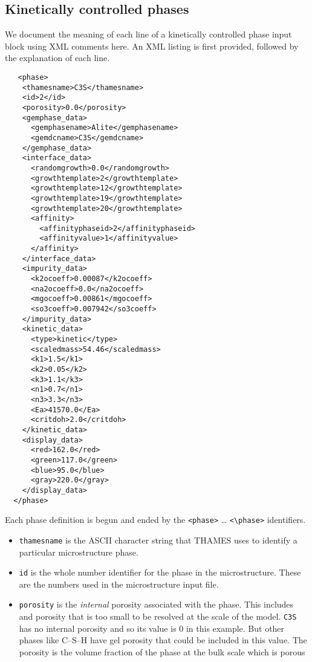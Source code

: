 \documentclass{article}
\begin{document}
 \subsection{Kinetically controlled phases}
 We document the meaning of each line of a kinetically controlled phase input
 block using XML comments here.  An XML listing is first provided, followed
 by the explanation of each line.
 \begin{lstlisting}
   <phase>
    <thamesname>C3S</thamesname>
    <id>2</id>
    <porosity>0.0</porosity>
    <gemphase_data>
      <gemphasename>Alite</gemphasename>
      <gemdcname>C3S</gemdcname>
    </gemphase_data>
    <interface_data>
      <randomgrowth>0.0</randomgrowth>
      <growthtemplate>2</growthtemplate>
      <growthtemplate>12</growthtemplate>
      <growthtemplate>19</growthtemplate>
      <growthtemplate>20</growthtemplate>
      <affinity>
        <affinityphaseid>2</affinityphaseid>
        <affinityvalue>1</affinityvalue>
      </affinity>
    </interface_data>
    <impurity_data>
      <k2ocoeff>0.00087</k2ocoeff>
      <na2ocoeff>0.0</na2ocoeff>
      <mgocoeff>0.00861</mgocoeff>
      <so3coeff>0.007942</so3coeff>
    </impurity_data>
    <kinetic_data>
      <type>kinetic</type>
      <scaledmass>54.46</scaledmass>
      <k1>1.5</k1>
      <k2>0.05</k2>
      <k3>1.1</k3>
      <n1>0.7</n1>
      <n3>3.3</n3>
      <Ea>41570.0</Ea>
      <critdoh>2.0</critdoh>
    </kinetic_data>
    <display_data>
      <red>162.0</red>
      <green>117.0</green>
      <blue>95.0</blue>
      <gray>220.0</gray>
    </display_data>
  </phase>
  \end{lstlisting}

Each phase definition is begun and ended by the \verb!<phase>! \ldots
\verb!<\phase>! identifiers.
\begin{itemize}
	\item \texttt{thamesname} is the ASCII character string that THAMES uses
	to identify a particular microstructure phase.
	\item \texttt{id} is the whole number identifier for the phase in the
	microstructure.  These are the numbers used in the microstructure input
	file.
	\item \texttt{porosity} is the \textit{internal} porosity associated with
	the phase.  This includes and porosity that is too small to be resolved at
	the scale of the model.  \texttt{C3S} has no internal porosity and so its
	value is 0 in this example.  But other phases like C--S--H have gel porosity
	that could be included in this value.  The porosity is the volume fraction
	of the phase at the bulk scale which is porous
\end{itemize}
\end{document}

